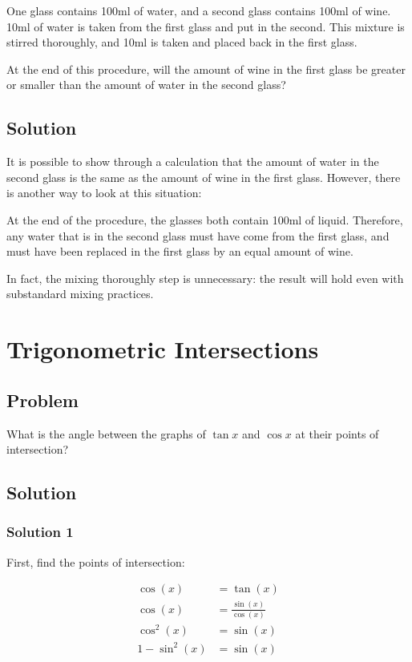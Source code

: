 \documentclass{book}
\begin{document}
One glass contains 100ml of water, and a second glass contains 100ml of wine. 10ml of water is taken from the first glass and put in the second. This mixture is stirred thoroughly, and 10ml is taken and placed back in the first glass.

At the end of this procedure, will the amount of wine in the first glass be greater or smaller than the amount of water in the second glass?

\subsection{Solution}
It is possible to show through a calculation that the amount of water in the second glass is the same as the amount of wine in the first glass. However, there is another way to look at this situation:

At the end of the procedure, the glasses both contain 100ml of liquid. Therefore, any water that is in the second glass must have come from the first glass, and must have been replaced in the first glass by an equal amount of wine.

In fact, the mixing thoroughly step is unnecessary: the result will hold even with substandard mixing practices.

\newpage
\section{Trigonometric Intersections}

\subsection{Problem}

What is the angle between the graphs of \(\tan x\) and \(\cos x\) at their points of intersection?
\subsection{Solution}
\subsubsection{Solution 1}
First, find the points of intersection:

\begin{align*}
\cos(x)&=\tan(x)\\
\cos(x)&=\frac{\sin(x)}{\cos(x)}\\
\cos^2(x)&=\sin(x)\\
1-\sin^2(x)&=\sin(x)
\end{align*}
\end{document}
